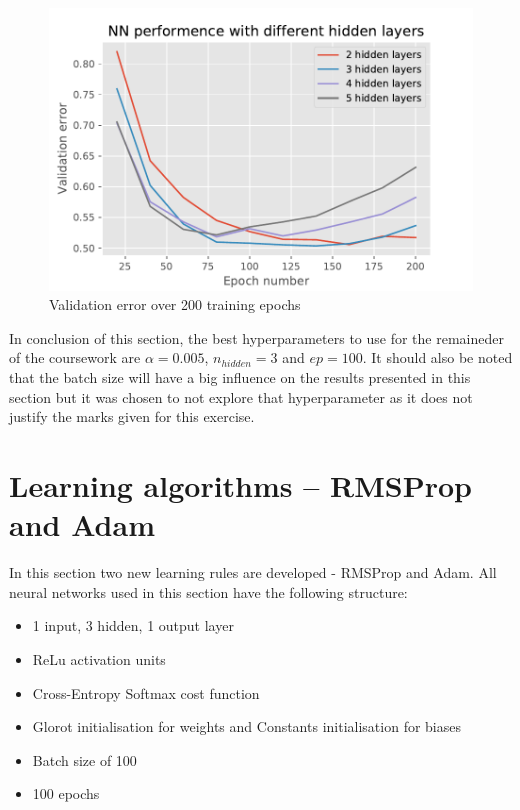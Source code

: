 \documentclass{article}
\begin{document}
\begin{figure}[tb]
\vskip 5mm
\begin{center}
\centerline{\includegraphics[width=\columnwidth]{ex1_part2.pdf}}
\caption{Validation error over 200 training epochs}
\label{fig:ex1_part2}
\end{center}
\vskip -5mm
\end{figure} 

In conclusion of this section, the best hyperparameters to use for the remaineder of the coursework are $\alpha = 0.005$, $n_{hidden} = 3$ and $ep = 100$. It should also be noted that the batch size will have a big influence on the results presented in this section but it was chosen to not explore that hyperparameter as it does not justify the marks given for this exercise.

\section{Learning algorithms -- RMSProp and Adam}
In this section two new learning rules are developed - RMSProp and Adam. All neural networks used in this section have the following structure:
\begin{itemize}
    \itemsep0em 
    \item 1 input, 3 hidden, 1 output layer
    \item ReLu activation units
    \item Cross-Entropy Softmax cost function
    \item Glorot initialisation for weights and Constants initialisation for biases
    \item Batch size of 100
    \item 100 epochs
\end{itemize}
\end{document}

